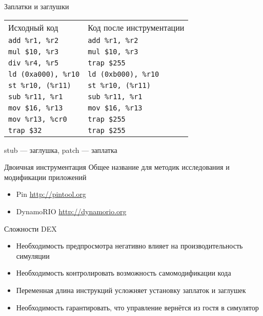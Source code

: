 \begin{frame}{Заплатки и заглушки}
\begin{tabular}{ll}
Исходный код                    &    Код после инструментации \\
\texttt{add \%r1, \%r2}         &    \texttt{add \%r1, \%r2} \\
\texttt{mul \$10, \%r3}         &    \texttt{mul \$10, \%r3} \\
\texttt{div \%r4, \%r5}         &    \texttt{trap \$255} \\
\texttt{ld (0xa000), \%r10}     &    \texttt{ld (0xb000), \%r10} \\
\texttt{st \%r10, (\%r11)}      &    \texttt{st \%r10, (\%r11)} \\
\texttt{sub \%r11, \%r1}        &    \texttt{sub \%r11, \%r1} \\
\texttt{mov \$16, \%r13}        &    \texttt{mov \$16, \%r13} \\
\texttt{mov \%r13, \%cr0}       &    \texttt{trap \$255} \\
\texttt{trap \$32}              &    \texttt{trap \$255} \\
\end{tabular}

\vfill
stub — заглушка, patch — заплатка

\end{frame}

\begin{frame}{Двоичная инструментация}
Общее название для методик исследования и модификации приложений

\begin{itemize}
\item Pin \url{http://pintool.org}
\item DynamoRIO \url{http://dynamorio.org}
\end{itemize}

\end{frame}

\begin{frame}[fragile]{Сложности DEX}

\begin{itemize}
\item Необходимость предпросмотра негативно влияет на производительность симуляции
\item Необходимость контролировать возможность самомодификации кода
\item Переменная длина инструкций усложняет установку заплаток и заглушек
\item Необходимость гарантировать, что управление вернётся из гостя в симулятор
\end{itemize}
\end{frame}

